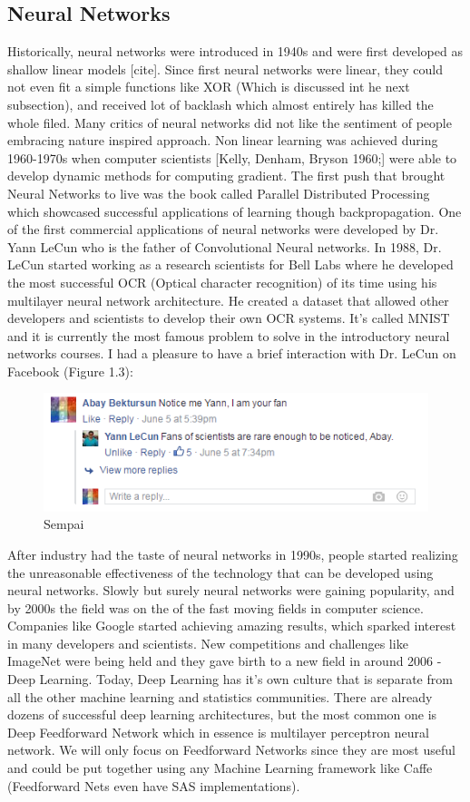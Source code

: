 \documentclass[paper=a4, fontsize=11pt]{scrartcl}
\numberwithin{equation}{section}		%
\numberwithin{figure}{section}			%
\numberwithin{table}{section}			%
\begin{document}
	\subsection{Neural Networks}
	Historically, neural networks were introduced in 1940s and were first developed as shallow linear models [cite]. Since first neural networks were linear, they could not even fit a simple functions like XOR (Which is discussed int he next subsection), and received lot of backlash which almost entirely has killed the whole filed. Many critics of neural networks did not like the sentiment of people embracing nature inspired approach. Non linear learning was achieved during 1960-1970s when computer scientists [Kelly, Denham, Bryson 1960;] were able to develop dynamic methods for computing gradient.
	The first push that brought Neural Networks to live was the book called Parallel Distributed Processing which showcased successful applications of learning though backpropagation.
	One of the first commercial applications of neural networks were developed by Dr. Yann LeCun who is the father of Convolutional Neural networks. In 1988, Dr. LeCun started working as a research scientists for Bell Labs where he developed the most successful OCR (Optical character recognition) of its time using his multilayer neural network architecture. He created a dataset that allowed other developers and scientists to develop their own OCR systems. It's called MNIST and it is currently the most famous problem to solve in the introductory neural networks courses. I had a pleasure to  have a brief interaction with Dr. LeCun on Facebook (Figure 1.3):
	\begin{figure}[!htb]
		\centering
		\includegraphics[scale=0.55]{sempai.PNG}
		\caption{Sempai}
		\label{fig:sempai}
	\end{figure}
	\newline After industry had the taste of neural networks in 1990s, people started realizing the unreasonable effectiveness of the technology that can be developed using neural networks. Slowly but surely neural networks were gaining popularity, and by 2000s the field was on the of the fast moving fields in computer science. Companies like Google started achieving amazing results, which sparked interest in many developers and scientists. New competitions and challenges like ImageNet were being held and they gave birth to a new field in around 2006 - Deep Learning. Today, Deep Learning has it's own culture that is separate from all the other machine learning and statistics communities. There are already dozens of successful deep learning architectures, but the most common one is Deep Feedforward Network which in essence is multilayer perceptron neural network. We will only focus on Feedforward Networks since they are most useful and could be put together using any Machine Learning framework like Caffe (Feedforward Nets even have SAS implementations).
\end{document}
